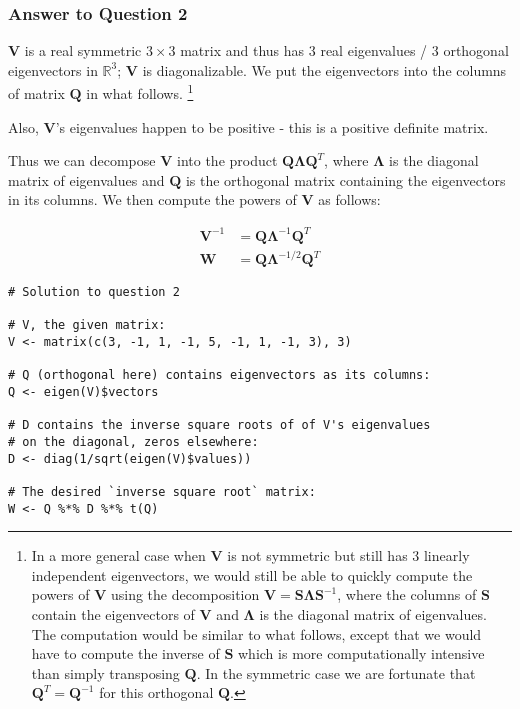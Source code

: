 \documentclass[paper=a4, fontsize=11pt]{scrartcl} %
\newcommand{\matLambda}{\mathbf{\Lambda}}
\newcommand{\matS}{\mathbf{S}}
\newcommand{\matV}{\mathbf{V}}
\newcommand{\matQ}{\mathbf{Q}}
\newcommand{\matW}{\mathbf{W}}
\begin{document}
\bigskip
\subsubsection*{Answer to Question 2}
$\matV$ is a real symmetric $3 \times 3$ matrix and thus has $3$ real eigenvalues / $3$ orthogonal eigenvectors in $\mathbb{R}^3$; $\matV$ is diagonalizable. We put the eigenvectors into the columns of matrix $\matQ$ in what follows. \footnote{ 
In a more general case when $\matV$ is not symmetric but still has 3 linearly independent eigenvectors, we would still be able to quickly compute the powers of  $\matV$ using the decomposition $\matV = \matS \matLambda \matS^{-1}$, where the columns of $\matS$ contain the eigenvectors of $ \matV$ and $\matLambda$ is the diagonal matrix of eigenvalues. The computation would be similar to what follows, except that we would have to compute the inverse of $\matS$ which is more computationally intensive than simply transposing $\matQ$. In the symmetric case we are fortunate that  $\matQ^T = \matQ^{-1}$ for this orthogonal $\matQ$.}   


Also, $\matV$'s eigenvalues happen to be positive - this is a positive definite matrix.

Thus we can decompose  $\matV$ into the product $\matQ \matLambda \matQ^{T}$, where  $\matLambda$ is the diagonal matrix of eigenvalues and $\matQ$ is the orthogonal matrix containing the eigenvectors in its columns.  We then compute the powers of $\matV$ as follows:

\begin{align*}
\matV^{-1} &= \matQ \matLambda^{-1} \matQ^{T} \\
\matW &= \matQ \matLambda^{-1/2} \matQ^{T} 
\end{align*}

\pagebreak


\begin{lstlisting}[basicstyle=\ttfamily\small\bfseries]
# Solution to question 2

# V, the given matrix:
V <- matrix(c(3, -1, 1, -1, 5, -1, 1, -1, 3), 3) 

# Q (orthogonal here) contains eigenvectors as its columns: 
Q <- eigen(V)$vectors              

# D contains the inverse square roots of of V's eigenvalues 
# on the diagonal, zeros elsewhere:
D <- diag(1/sqrt(eigen(V)$values))

# The desired `inverse square root` matrix:
W <- Q %*% D %*% t(Q)      

\end{lstlisting}
\end{document}
